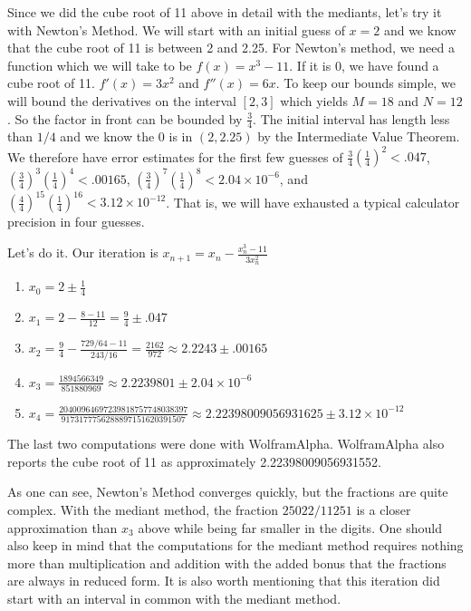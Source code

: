 \documentclass[12pt]{article}
\begin{document}
Since we did the cube root of 11 above in detail with the mediants, let's try it with Newton's Method. We will start with an initial guess of $x=2$ and we know that the cube root of 11 is between 2 and 2.25. For Newton's method, we need a function which we will take to be $f(x) = x^3 - 11$. If it is 0, we have found a cube root of 11. $f'(x) = 3x^2$ and $f''(x) = 6x$. To keep our bounds simple, we will bound the derivatives on the interval $[2,3]$ which yields $M = 18$ and $N = 12$. So the factor in front can be bounded by $\frac{3}{4}$. The initial interval has length less than $1/4$ and we know the $0$ is in $(2, 2.25)$ by the Intermediate Value Theorem. We therefore have error estimates for the first few guesses of $\frac{3}{4}(\frac{1}{4})^2 < .047$, $(\frac{3}{4})^3(\frac{1}{4})^4 < .00165$, $(\frac{3}{4})^7(\frac{1}{4})^8 < 2.04\times 10^{-6}$, and $(\frac{4}{4})^{15}(\frac{1}{4})^{16} < 3.12 \times 10^{-12}$. That is, we will have exhausted a typical calculator precision in four guesses. 

Let's do it. Our iteration is $x_{n+1} = x_n - \frac{x_n^3 -11}{3 x_n^2}$ 
\begin{enumerate}
\item $x_0 = 2 \pm \frac{1}{4}$
\item $x_1 = 2 - \frac{8- 11}{12} = \frac{9}{4} \pm .047$
\item $x_2 = \frac{9}{4} - \frac{ 729/64 - 11 }{243/16} = \frac{2162}{972}\approx 2.2243 \pm .00165$
\item $x_3 = \frac{1894566349}{851880969} \approx 2.2239801 \pm 2.04\times 10^{-6}$
\item $x_4 = \frac{20400964697239818757748038397}{9173177756288897151620391507} \approx 2.22398009056931625 \pm 3.12 \times 10^{-12}$
\end{enumerate}


The last two computations were done with WolframAlpha.  WolframAlpha also reports the cube root of 11 as approximately 2.22398009056931552. 

As one can see, Newton's Method converges quickly, but the fractions are quite complex. With the mediant method, the fraction $25022/11251$ is a closer approximation than $x_3$ above while being far smaller in the digits. One should also keep in mind that the computations for the mediant method requires nothing more than multiplication and addition with the added bonus that the fractions are always in reduced form. It is also worth mentioning that this iteration did start with an interval in common with the mediant method. 
\end{document}
